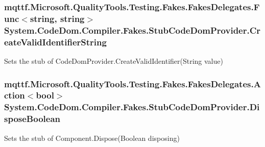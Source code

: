 \hypertarget{class_system_1_1_code_dom_1_1_compiler_1_1_fakes_1_1_stub_code_dom_provider_aeecc8bd7cfa117707b95269be17bbfab}{
\subsubsection[{Create\-Valid\-Identifier\-String}]{\setlength{\rightskip}{0pt plus 5cm}mqttf.\-Microsoft.\-Quality\-Tools.\-Testing.\-Fakes.\-Fakes\-Delegates.\-Func$<$string, string$>$ System.\-Code\-Dom.\-Compiler.\-Fakes.\-Stub\-Code\-Dom\-Provider.\-Create\-Valid\-Identifier\-String}}\label{class_system_1_1_code_dom_1_1_compiler_1_1_fakes_1_1_stub_code_dom_provider_aeecc8bd7cfa117707b95269be17bbfab}


Sets the stub of Code\-Dom\-Provider.\-Create\-Valid\-Identifier(\-String value)

\hypertarget{class_system_1_1_code_dom_1_1_compiler_1_1_fakes_1_1_stub_code_dom_provider_a21358b1745e1cbaab6c9310adee7d3f8}{
\subsubsection[{Dispose\-Boolean}]{\setlength{\rightskip}{0pt plus 5cm}mqttf.\-Microsoft.\-Quality\-Tools.\-Testing.\-Fakes.\-Fakes\-Delegates.\-Action$<$bool$>$ System.\-Code\-Dom.\-Compiler.\-Fakes.\-Stub\-Code\-Dom\-Provider.\-Dispose\-Boolean}}\label{class_system_1_1_code_dom_1_1_compiler_1_1_fakes_1_1_stub_code_dom_provider_a21358b1745e1cbaab6c9310adee7d3f8}


Sets the stub of Component.\-Dispose(\-Boolean disposing)

